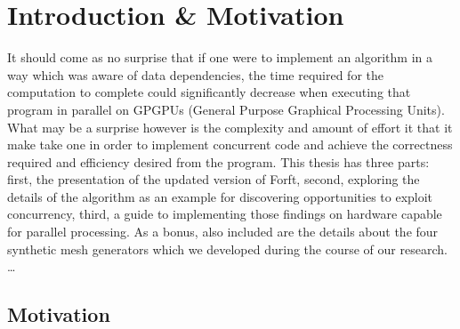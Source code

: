\chapter{Introduction \& Motivation}
\label{ch1}
It should come as no surprise that if one were to implement an algorithm in a way which was aware of data dependencies, the time required for the computation to complete could significantly decrease when executing that program in parallel on GPGPUs (General Purpose Graphical Processing Units).  What may be a surprise however is the complexity and amount of effort it that it make take one in order to implement concurrent code and achieve the correctness required and efficiency desired from the program. This thesis has three parts: first, the presentation of the updated version of Forf{t}, second, exploring the details of the algorithm as an example for discovering opportunities to exploit concurrency, third, a guide to implementing those findings on hardware capable for parallel processing. As a bonus, also included are the details about the four synthetic mesh generators which we developed during the course of our research.
\ldots
{}





%
%
%
%
%
%
\section{Motivation}

